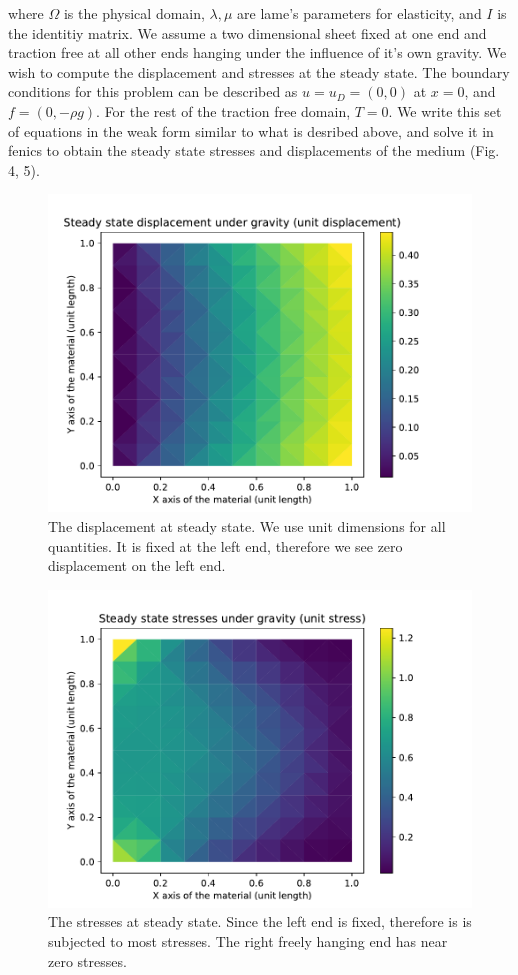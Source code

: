 \documentclass{article}
\begin{document}
where $\Omega$ is the physical domain, $\lambda, \mu$ are lame's parameters for elasticity, and $I$ is the identitiy matrix. We assume a two dimensional sheet fixed at one end and traction free at all other ends hanging under the influence of it's own gravity. We wish to compute the displacement and stresses at the steady state. The boundary conditions for this problem can be described as $u = u_D = (0,0)$ at $x = 0$, and $f = (0,-\rho g)$. For the rest of the traction free domain, $T = 0$. We write this set of equations in the weak form similar to what is desribed above, and solve it in fenics to obtain the steady state stresses and displacements of the medium (Fig. 4, 5). 
\begin{figure}[!htb]
    \centering
    \includegraphics[scale=0.5]{u.pdf}
    \caption{The displacement at steady state. We use unit dimensions for all quantities. It is fixed at the left end, therefore we see zero displacement on the left end.}
\end{figure}
\begin{figure}[!htb]
    \centering
    \includegraphics[scale=0.5]{vm.pdf}
    \caption{The stresses at steady state. Since the left end is fixed, therefore is is subjected to most stresses. The right freely hanging end has near zero stresses.}
\end{figure}
\end{document}
